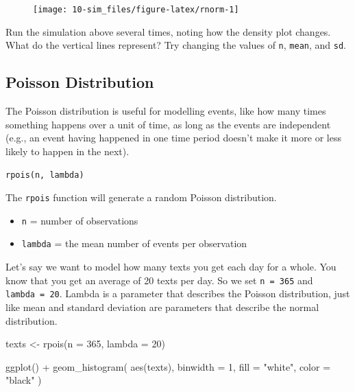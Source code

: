 \documentclass[
  oneside]{book}
\newenvironment{Shaded}{\begin{snugshade}}{\end{snugshade}}
\newcommand{\AttributeTok}[1]{\textcolor[rgb]{0.77,0.63,0.00}{#1}}
\newcommand{\DecValTok}[1]{\textcolor[rgb]{0.00,0.00,0.81}{#1}}
\newcommand{\FunctionTok}[1]{\textcolor[rgb]{0.00,0.00,0.00}{#1}}
\newcommand{\NormalTok}[1]{#1}
\newcommand{\OtherTok}[1]{\textcolor[rgb]{0.56,0.35,0.01}{#1}}
\newcommand{\SpecialCharTok}[1]{\textcolor[rgb]{0.00,0.00,0.00}{#1}}
\newcommand{\StringTok}[1]{\textcolor[rgb]{0.31,0.60,0.02}{#1}}
\providecommand{\tightlist}{%
  \setlength{\itemsep}{0pt}\setlength{\parskip}{0pt}}
\begin{document}
\begin{figure}

{\centering \texttt{[image: 10-sim\_files/figure-latex/rnorm-1]} 

}

\end{figure}

\begin{info}
Run the simulation above several times, noting how the density plot changes. What do the vertical lines represent? Try changing the values of \texttt{n}, \texttt{mean}, and \texttt{sd}.

\end{info}

\hypertarget{poisson}{%
\subsection{Poisson Distribution}\label{poisson}}

The Poisson distribution is useful for modelling events, like how many times something happens over a unit of time, as long as the events are independent (e.g., an event having happened in one time period doesn't make it more or less likely to happen in the next).

\texttt{rpois(n,\ lambda)}

The \texttt{rpois} function will generate a random Poisson distribution.

\begin{itemize}
\tightlist
\item
  \texttt{n} = number of observations
\item
  \texttt{lambda} = the mean number of events per observation
\end{itemize}

Let's say we want to model how many texts you get each day for a whole. You know that you get an average of 20 texts per day. So we set \texttt{n\ =\ 365} and \texttt{lambda\ =\ 20}. Lambda is a parameter that describes the Poisson distribution, just like mean and standard deviation are parameters that describe the normal distribution.

\begin{Shaded}
\begin{Highlighting}[]
\NormalTok{texts }\OtherTok{\textless{}{-}} \FunctionTok{rpois}\NormalTok{(}\AttributeTok{n =} \DecValTok{365}\NormalTok{, }\AttributeTok{lambda =} \DecValTok{20}\NormalTok{)}

\FunctionTok{ggplot}\NormalTok{() }\SpecialCharTok{+}
  \FunctionTok{geom\_histogram}\NormalTok{(}
    \FunctionTok{aes}\NormalTok{(texts), }
    \AttributeTok{binwidth =} \DecValTok{1}\NormalTok{, }
    \AttributeTok{fill =} \StringTok{"white"}\NormalTok{, }
    \AttributeTok{color =} \StringTok{"black"}
\NormalTok{  )}
\end{Highlighting}
\end{Shaded}
\end{document}
